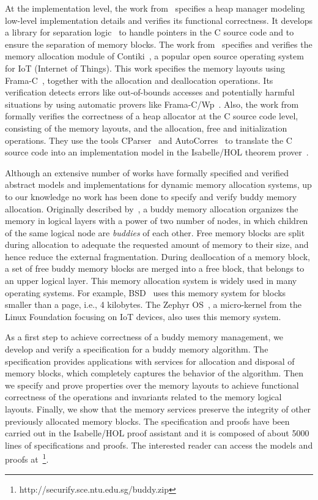 At the implementation level, the work from~\cite{reg_marti} specifies a heap manager modeling low-level implementation details and verifies its functional correctness. It develops a library for separation logic~\cite{reg_reynolds} to handle pointers in the C source code and to ensure the separation of memory blocks. The work from~\cite{reg_mangano} specifies and verifies the memory allocation module of Contiki~\cite{reg_dunkers}, a popular open source operating system for IoT (Internet of Things). This work specifies the memory layouts using Frama-C~\cite{reg_kirchner}, together with the allocation and deallocation operations. Its verification detects errors like out-of-bounds accesses and potentially harmful situations by using automatic provers like Frama-C/Wp~\cite{reg_allan}. Also, the work from~\cite{reg_sahebolamri} formally verifies the correctness of a heap allocator at the C source code level, consisting of the memory layouts, and the allocation, free and initialization operations. They use the tools CParser~\cite{reg_tuch} and AutoCorres~\cite{reg_greenaway} to translate the C source code into an implementation model in the Isabelle/HOL theorem prover~\cite{reg_Isabelle/HOL}.

Although an extensive number of works have formally specified and verified abstract models and implementations for dynamic memory allocation systems, up to our knowledge no work has been done to specify and verify buddy memory allocation. Originally described by~\cite{reg_knowlton}, a buddy memory allocation organizes the memory in logical layers with a power of two number of nodes, in which children of the same logical node are \emph{buddies} of each other. Free memory blocks are split during allocation to adequate the requested amount of memory to their size, and hence reduce the external fragmentation. During deallocation of a memory block, a set of free buddy memory blocks are merged into a free block, that belongs to an upper logical layer. This memory allocation system is widely used in many operating systems. For example, BSD~\cite{reg_mckusick} uses this memory system for blocks smaller than a page, i.e., 4 kilobytes. The Zephyr OS~\cite{reg_zephyr}, a micro-kernel from the Linux Foundation focusing on IoT devices, also uses this memory system.

As a first step to achieve correctness of a buddy memory management, we develop and verify a specification for a buddy memory algorithm. The specification provides applications with services for allocation and disposal of memory blocks, which completely captures the behavior of the algorithm. Then we specify and prove properties over the memory layouts to achieve functional correctness of the operations and invariants related to the memory logical layouts. Finally, we show that the memory services preserve the integrity of other previously allocated memory blocks. The specification and proofs have been carried out in the Isabelle/HOL proof assistant and it is composed of about 5000 lines of specifications and proofs. The interested reader can access the models and proofs at~\footnote{http://securify.sce.ntu.edu.sg/buddy.zip}.

